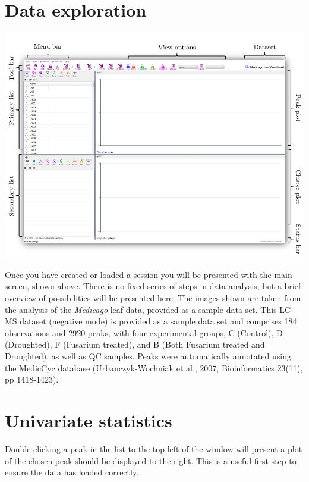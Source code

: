 \documentclass[11pt,a4paper]{article}
\begin{document}
\section{Data exploration}
\begin{center}
	\includegraphics[max width=0.7\linewidth]{"Images/userguide/main screen"}
\end{center}
Once you have created or loaded a session you will be presented with the main screen, shown above. There is no fixed series of steps in data analysis, but a brief overview of possibilities will be presented here. The images shown are taken from the analysis of the \textit{Medicago} leaf data, provided as a sample data set. This LC-MS dataset (negative mode) is provided as a sample data set and comprises 184 observations and 2920 peaks, with four experimental groups, C (Control), D (Droughted), F (Fusarium treated), and B (Both Fusarium treated and Droughted), as well as QC samples. Peaks were automatically annotated using the MedicCyc database (Urbanczyk-Wochniak et al., 2007, Bioinformatics 23(11), pp 1418-1423).

\section{Univariate statistics}
\label{section:ug_univariate}
Double clicking a peak in the list to the top-left of the window will present a plot of the chosen peak should be displayed to the right. This is a useful first step to ensure the data has loaded correctly.
\end{document}

